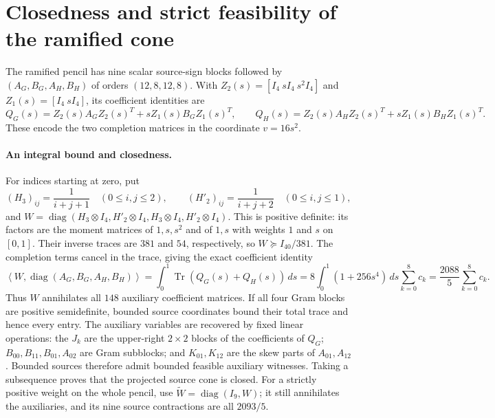 \section*{Closedness and strict feasibility of the ramified cone}
The ramified pencil has nine scalar source-sign blocks followed by
$(A_G,B_G,A_H,B_H)$ of orders $(12,8,12,8)$. With
$Z_2(s)=[I_4\ sI_4\ s^2I_4]$ and $Z_1(s)=[I_4\ sI_4]$, its coefficient
identities are
\[
 Q_G(s)=Z_2(s)A_GZ_2(s)^T+sZ_1(s)B_GZ_1(s)^T,
 \qquad Q_H(s)=Z_2(s)A_HZ_2(s)^T+sZ_1(s)B_HZ_1(s)^T.
\]
These encode the two completion matrices in the coordinate $v=16s^2$.

\paragraph{An integral bound and closedness.}
For indices starting at zero, put
\[
 (H_3)_{ij}=\frac1{i+j+1}\quad(0\le i,j\le2),\qquad
 (H'_2)_{ij}=\frac1{i+j+2}\quad(0\le i,j\le1),
\]
and $W=\operatorname{diag}(H_3\otimes I_4,H'_2\otimes I_4,
H_3\otimes I_4,H'_2\otimes I_4)$. This is positive definite: its factors
are the moment matrices of $1,s,s^2$ and of $1,s$ with weights $1$ and
$s$ on $[0,1]$. Their inverse traces are $381$ and $54$, respectively,
so $W\succeq I_{40}/381$. The completion terms cancel in the trace, giving
the exact coefficient identity
\begin{equation}
 \left\langle W,\operatorname{diag}(A_G,B_G,A_H,B_H)\right\rangle
 =\int_0^1\operatorname{Tr}(Q_G(s)+Q_H(s))\,ds
 =8\int_0^1(1+256s^4)\,ds\sum_{k=0}^8c_k
 =\frac{2088}{5}\sum_{k=0}^8c_k.                    \label{eq:ramified-moment}
\end{equation}
Thus $W$ annihilates all $148$ auxiliary coefficient matrices.
If all four Gram blocks are positive semidefinite, bounded source
coordinates bound their total trace and hence every entry. The auxiliary
variables are recovered by fixed linear operations: the $J_k$ are the
upper-right $2\times2$ blocks of the coefficients of $Q_G$;
$B_{00},B_{11},B_{01},A_{02}$ are Gram subblocks; and $K_{01},K_{12}$
are the skew parts of $A_{01},A_{12}$. Bounded sources therefore admit
bounded feasible auxiliary witnesses. Taking a subsequence proves that
the projected source cone is closed. For a strictly positive weight
on the whole pencil, use $\widetilde W=\operatorname{diag}(I_9,W)$;
it still annihilates the auxiliaries, and its nine source contractions
are all $2093/5$.


